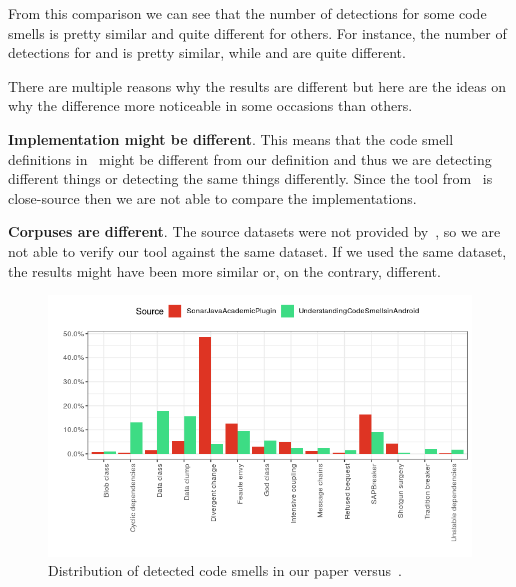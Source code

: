 From this comparison we can see that the number of detections for some code smells is pretty similar and quite different for others.
For instance, the number of detections for  and  is pretty similar, while
 and  are quite different.

There are multiple reasons why the results are different but here are the ideas on why the difference more noticeable in
some occasions than others.

\begin{flushleft}
    \textbf{Implementation might be different}.
    This means that the code smell definitions in~\cite{mannan2016understanding} might be different from our definition and
    thus we are detecting different things or detecting the same things differently.
    Since the tool from~\cite{mannan2016understanding} is close-source then we are not able to compare the implementations.
\end{flushleft}

\begin{flushleft}
    \textbf{Corpuses are different}.
    The source datasets were not provided by~\citeauthor{mannan2016understanding}, so we are not able to verify our tool against
    the same dataset.
    If we used the same dataset, the results might have been more similar or, on the contrary, different.
\end{flushleft}

\begin{figure} [htb]
    \includegraphics[scale=0.8]{figures/comparison_2.png}
    \caption{Distribution of detected code smells in our paper versus~\cite{mannan2016understanding}.}
    \label{fig:comparison_of_distributions}
\end{figure}

